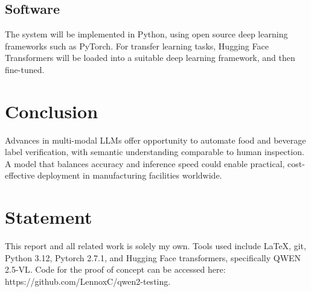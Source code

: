 \documentclass[conference]{IEEEtran}
\begin{document}
\subsection{Software}
The system will be implemented in Python, using open source deep learning frameworks such as PyTorch. For transfer learning tasks, Hugging Face Transformers will be loaded into a suitable deep learning framework, and then fine-tuned.

\section{Conclusion}

Advances in multi-modal LLMs offer opportunity to automate food and beverage label verification, with semantic understanding comparable to human inspection. A model that balances accuracy and inference speed could enable practical, cost-effective deployment in manufacturing facilities worldwide.

\section{Statement}

This report and all related work is solely my own. Tools used include LaTeX, git, Python 3.12, Pytorch 2.7.1, and Hugging Face transformers, specifically QWEN 2.5-VL. Code for the proof of concept can be accessed here: https://github.com/LennoxC/qwen2-testing.
\end{document}
